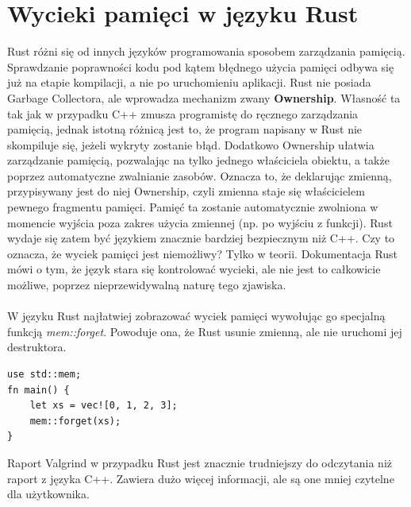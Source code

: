 \documentclass[12pt]{article}
\begin{document}
\section{Wycieki pamięci w języku Rust}
Rust różni się od innych języków programowania sposobem zarządzania pamięcią. Sprawdzanie poprawności kodu pod kątem błędnego użycia pamięci odbywa się już na etapie kompilacji, a nie po uruchomieniu aplikacji. Rust nie posiada Garbage Collectora, ale wprowadza mechanizm zwany \textbf{Ownership}. Własność ta tak jak w przypadku C++ zmusza programistę do ręcznego zarządzania pamięcią, jednak istotną różnicą jest to, że program napisany w Rust nie skompiluje się, jeżeli wykryty zostanie błąd. Dodatkowo Ownership ułatwia zarządzanie pamięcią, pozwalając na tylko jednego właściciela obiektu, a także poprzez automatyczne zwalnianie zasobów. Oznacza to, że deklarując zmienną, przypisywany jest do niej Ownership, czyli zmienna staje się właścicielem pewnego fragmentu pamięci. Pamięć ta zostanie automatycznie zwolniona w momencie wyjścia poza zakres użycia zmiennej (np. po wyjściu z funkcji). Rust wydaje się zatem być językiem znacznie bardziej bezpiecznym niż C++. Czy to oznacza, że wyciek pamięci jest niemożliwy? Tylko w teorii. Dokumentacja Rust mówi o tym, że język stara się kontrolować wycieki, ale nie jest to całkowicie możliwe, poprzez nieprzewidywalną naturę tego zjawiska. \\\\
W języku Rust najłatwiej zobrazować wyciek pamięci wywołując go specjalną funkcją \textit{mem::forget}. Powoduje ona, że Rust usunie zmienną, ale nie uruchomi jej destruktora. 
\begin{lstlisting}
use std::mem;
fn main() {
    let xs = vec![0, 1, 2, 3];
    mem::forget(xs);
}
\end{lstlisting}
\newpage
\noindent
Raport Valgrind w przypadku Rust jest znacznie trudniejszy do odczytania niż raport z języka C++. Zawiera dużo więcej informacji, ale są one mniej czytelne dla użytkownika.
\end{document}
